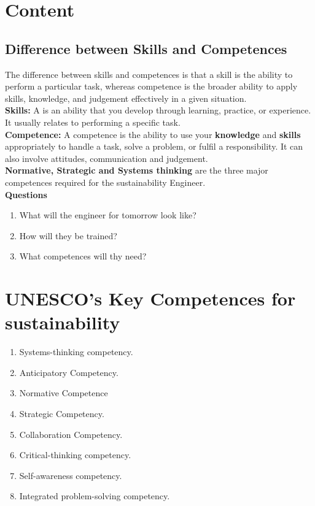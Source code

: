 \documentclass[11pt, a4paper]{article}
\begin{document}
\maketitle

\setcounter{page}{1}

\tableofcontents
\newpage
{}
\setcounter{page}{1}
\section{Content}
\subsection{Difference between Skills and Competences }
The difference between skills and competences is that a skill is the ability to perform a particular
task, whereas competence is the broader ability to apply skills, knowledge, and judgement effectively
in a given situation.\\

\noindent \textbf{Skills:} A is an ability that you develop through learning, practice, or experience.
It usually relates to performing a specific task.\\

\noindent \textbf{Competence:} A competence is the ability to use your \textbf{knowledge} and \textbf{skills} appropriately to handle a task, solve a problem, or fulfil a responsibility. It can also involve
attitudes, communication and judgement.\\

\noindent\textbf{Normative, Strategic and Systems thinking} are the three major competences required for the sustainability Engineer. \\


\noindent \textbf{Questions}
\begin{enumerate}
  \item What will the engineer for tomorrow look like?
  \item How will they be trained?
  \item What competences will thy need?
\end{enumerate}

\section{UNESCO's Key Competences for sustainability}
\begin{enumerate}
  \item Systems-thinking competency.
  \item Anticipatory Competency.
  \item Normative Competence
  \item Strategic Competency.
  \item Collaboration Competency.
  \item Critical-thinking competency.
  \item Self-awareness competency.
  \item Integrated problem-solving competency.
\end{enumerate}

\newpage
\nocite{*}
\printbibliography[
  heading=bibintoc,
  title={References}
]
\end{document}
